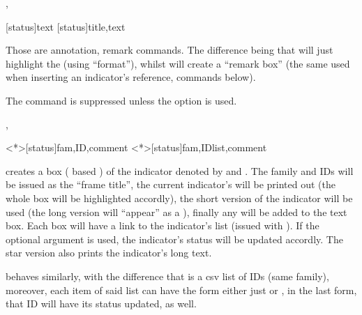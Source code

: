 \documentclass[article,nogeometry,english,tocdepth=3,secdepth=3]{ufrgscca} %
\begin{document}
\begin{codedescribe}{\textmark, \comment}
	\begin{codesyntax}%
	\tsmacro{\textmark}[status]{text}
	\tsmacro{\comment}[status]{title,text}
\end{codesyntax}
Those are annotation, remark commands. The difference being that \tsmacro{\textmark}{} will just highlight the  (using  “format”), whilst  will create a “remark box” (the same used when inserting an indicator's reference, commands below).
\begin{tsremark}[N.B.:]
 The command \tsmacro{\comment}{} is suppressed unless the option  is used.
 \end{tsremark}
\end{codedescribe}

\begin{codedescribe}{\indref,\indreflst}
	\begin{codesyntax}%
	\tsmacro{\indref}<*>[status]{fam,ID,comment}
	\tsmacro{\indreflst}<*>[status]{fam,IDlist,comment}
\end{codesyntax}
\tsmacro{\indref}{} creates a box ( based  ) of the indicator denoted by   and . The family and IDs will be issued as the “frame title”, the current indicator's  will be printed out (the whole box will be highlighted accordly), the short version of the indicator will be used (the long version will “appear” as a ), finally any  will be added to the text box. Each \tsmacro{\indref}{} box will have a link to the indicator's list (issued with \tsmacro{\PrintIndicators}{}). If the optional argument  is used, the indicator's status will be updated accordly. The star version also prints the indicator's long text.

\tsmacro{\indreflst}{} behaves similarly, with the difference that  is a csv list of IDs (same family), moreover, each item of said list can have the form either just  or , in the last form, that ID will have its status updated, as well.
\end{codedescribe}
\end{document}
